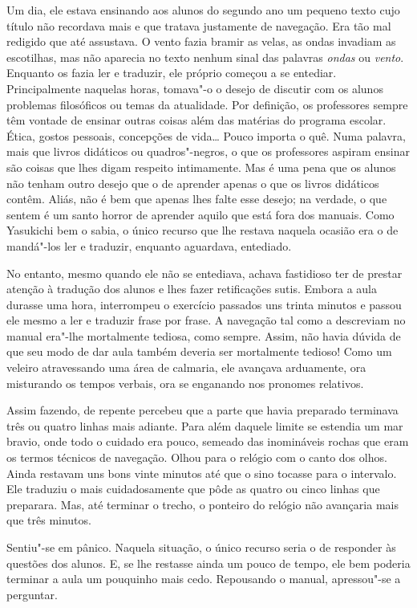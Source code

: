 Um dia, ele estava ensinando aos alunos do segundo ano um pequeno texto
cujo título não recordava mais e que tratava justamente de navegação.
Era tão mal redigido que até assustava. O vento fazia bramir as velas,
as ondas invadiam as escotilhas, mas não aparecia no texto nenhum sinal
das palavras \textit{ondas} ou \textit{vento}. Enquanto os fazia ler e traduzir, ele
próprio começou a se entediar. Principalmente naquelas horas, tomava"-o
o desejo de discutir com os alunos problemas filosóficos ou temas da
atualidade. Por definição, os professores sempre têm vontade de ensinar
outras coisas além das matérias do programa escolar. Ética, gostos
pessoais, concepções de vida\ldots{} Pouco importa o quê. Numa palavra, mais
que livros didáticos ou quadros"-negros, o que os professores aspiram
ensinar são coisas que lhes digam respeito intimamente. Mas é uma pena
que os alunos não tenham outro desejo que o de aprender apenas o que os
livros didáticos contêm. Aliás, não é bem que apenas lhes falte esse
desejo; na verdade, o que sentem é um santo horror de aprender aquilo
que está fora dos manuais. Como Yasukichi bem o sabia, o único recurso
que lhe restava naquela ocasião era o de mandá"-los ler e traduzir,
enquanto aguardava, entediado.

No entanto, mesmo quando ele não se entediava, achava fastidioso ter de
prestar atenção à tradução dos alunos e lhes fazer retificações sutis.
Embora a aula durasse uma hora, interrompeu o exercício passados uns
trinta minutos e passou ele mesmo a ler e traduzir frase por frase. A
navegação tal como a descreviam no manual era"-lhe mortalmente tediosa,
como sempre. Assim, não havia dúvida de que seu modo de dar aula também
deveria ser mortalmente tedioso! Como um veleiro atravessando uma área
de calmaria, ele avançava arduamente, ora misturando os tempos verbais,
ora se enganando nos pronomes relativos.

Assim fazendo, de repente percebeu que a parte que havia preparado
terminava três ou quatro linhas mais adiante. Para além daquele limite
se estendia um mar bravio, onde todo o cuidado era pouco, semeado das
inomináveis rochas que eram os termos técnicos de navegação. Olhou para
o relógio com o canto dos olhos. Ainda restavam uns bons vinte minutos
até que o sino tocasse para o intervalo. Ele traduziu o mais
cuidadosamente que pôde as quatro ou cinco linhas que preparara. Mas,
até terminar o trecho, o ponteiro do relógio não avançaria mais que
três minutos.

Sentiu"-se em pânico. Naquela situação, o único recurso seria o de
responder às questões dos alunos. E, se lhe restasse ainda um pouco de
tempo, ele bem poderia terminar a aula um pouquinho mais cedo.
Repousando o manual, apressou"-se a perguntar.

